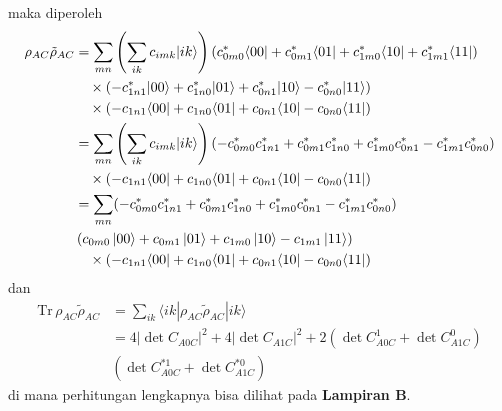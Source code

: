 maka diperoleh
\begin{equation}
	\begin{aligned}
		\rho_{AC} \tilde{\rho}_{AC}
		&= \sum_{m n}
		\left(
		\sum_{i k} c_{i m k} | i k \rangle
		\right)
		\left(
		c^{*}_{0m0} \langle 00|
		+ c^{*}_{0m1} \langle 01|
		+ c^{*}_{1m0} \langle 10|
		+ c^{*}_{1m1} \langle 11|
		\right) \\
		&\quad \times
		\left(
		- c^{*}_{1n1} |00\rangle
		+ c^{*}_{1n0} |01\rangle
		+ c^{*}_{0n1} |10\rangle
		- c^{*}_{0n0} |11\rangle
		\right) \\
		&\quad \times
		\left(
		- c_{1n1} \langle 00|
		+ c_{1n0} \langle 01|
		+ c_{0n1} \langle 10|
		- c_{0n0} \langle 11|
		\right)\\
		&= \sum_{m n}
		\left(
		\sum_{i k} c_{i m k} | i k \rangle
		\right)
		\left(
		- c^{*}_{0m0} c^{*}_{1n1}
		+ c^{*}_{0m1} c^{*}_{1n0}
		+ c^{*}_{1m0} c^{*}_{0n1}
		- c^{*}_{1m1} c^{*}_{0n0}
		\right) \\
		&\quad \times
		\left(
		- c_{1n1} \langle 00|
		+ c_{1n0} \langle 01|
		+ c_{0n1} \langle 10|
		- c_{0n0} \langle 11|
		\right)\\
		&= \sum_{m n}
		(- c^{*}_{0m0} c^{*}_{1n1}
		+ c^{*}_{0m1} c^{*}_{1n0}
		+ c^{*}_{1m0} c^{*}_{0n1}
		- c^{*}_{1m1} c^{*}_{0n0})\\
		&\left(
		c_{0m0} \ket{00}
		+ c_{0m1} \ket{01}
		+ c_{1m0} \ket{10}
		- c_{1m1} \ket{11}
		\right) \\
		&\quad \times
		\left(
		- c_{1n1} \langle 00|
		+ c_{1n0} \langle 01|
		+ c_{0n1} \langle 10|
		- c_{0n0} \langle 11|
		\right)
	\end{aligned}
\end{equation}
dan
\begin{equation}
	\begin{aligned}
		\mathrm{Tr}\,\rho_{AC} \tilde{\rho}_{AC}
		&= \sum_{i k}
		\langle i k |
		\rho_{AC} \tilde{\rho}_{AC}
		| i k \rangle \\
		&= 4 |\det C_{A0C}|^2
		+ 4 |\det C_{A1C}|^2
		+ 2 (\det C_{A0C}^1 + \det C_{A1C}^0)\\
		&(\det C^{*1}_{A0C} + \det C^{*0}_{A1C})
	\end{aligned}
\end{equation}
di mana perhitungan lengkapnya bisa dilihat pada \textbf{Lampiran B}.

